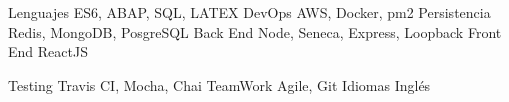 


\begin{cvskills}

\cvskill
{Lenguajes} %
{ES6, ABAP, SQL, LATEX } %
\cvskill
{DevOps} %
{AWS, Docker, pm2} %
\cvskill
{Persistencia} %
{Redis, MongoDB, PosgreSQL} %
\cvskill
{Back End} %
{Node, Seneca, Express, Loopback} %
\cvskill
{Front End} %
{ReactJS} %

\cvskill
{Testing} %
{Travis CI, Mocha, Chai} %
\cvskill
{TeamWork} %
{Agile, Git} %
\cvskill
{Idiomas} %
{Inglés} %
\end{cvskills}
